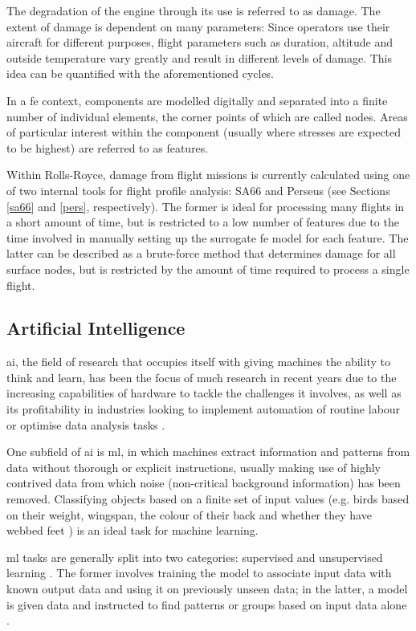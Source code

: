The degradation of the engine through its use is referred to as damage. The extent of damage is dependent on many parameters: Since operators use their aircraft for different purposes, flight parameters such as duration, altitude and outside temperature vary greatly and result in different levels of damage. This idea can be quantified with the aforementioned cycles.

In a \ac{fe} context, components are modelled digitally and separated into a finite number of individual elements, the corner points of which are called nodes. Areas of particular interest within the component (usually where stresses are expected to be highest) are referred to as features.

Within Rolls-Royce, damage from flight missions is currently calculated using one of two internal tools for flight profile analysis: SA66 and Perseus (see Sections \ref{sa66} and \ref{pers}, respectively). The former is ideal for processing many flights in a short amount of time, but is restricted to a low number of features due to the time involved in manually setting up the surrogate \ac{fe} model for each feature. The latter can be described as a brute-force method that determines damage for all surface nodes, but is restricted by the amount of time required to process a single flight.

\subsection{Artificial Intelligence}
\ac{ai}, the field of research that occupies itself with giving machines the ability to think and learn, has been the focus of much research in recent years due to the increasing capabilities of hardware to tackle the challenges it involves, as well as its profitability in industries looking to implement automation of routine labour or optimise data analysis tasks \cite[]{goodfellow_deep_2016}.

One subfield of \ac{ai} is \ac{ml}, in which machines extract information and patterns from data without thorough or explicit instructions, usually making use of highly contrived data from which noise (non-critical background information) has been removed. Classifying objects based on a finite set of input values (e.g. birds based on their weight, wingspan, the colour of their back and whether they have webbed feet \cite[]{harrington_machine_2012}) is an ideal task for machine learning.

\ac{ml} tasks are generally split into two categories: supervised and unsupervised learning \cite[]{kelleher_fundamentals_2015}. The former involves training the model to associate input data with known output data and using it on previously unseen data; in the latter, a model is given data and instructed to find patterns or groups based on input data alone \cite[]{goodfellow_deep_2016}.

